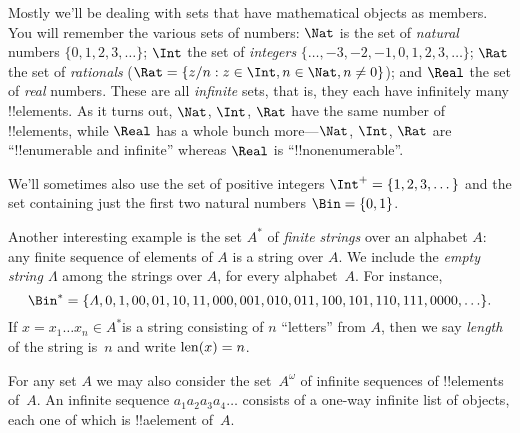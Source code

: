 \documentclass[../../../include/open-logic-section]{subfiles}
\begin{document}

\begin{ex}
Mostly we'll be dealing with sets that have mathematical objects as
members. You will remember the various sets of numbers: $\Nat$
is the set of \emph{natural} numbers $\{0, 1, 2, 3, \dots\}$;
$\Int$ the set of \emph{integers} $\{\dots, -3, -2,
-1, 0, 1, 2, 3, \dots\}$; $\Rat$ the set of
\emph{rationals} ($\Rat = \Setabs{z/n}{z \in \Int, n \in \Nat, n \neq 0}$); and
$\Real$ the set of \emph{real} numbers. These are all \emph{infinite}
sets, that is, they each have infinitely many !!{element}s. As it turns
out, $\Nat$, $\Int$, $\Rat$ have the same number
of !!{element}s, while $\Real$ has a whole bunch more---$\Nat$,
$\Int$, $\Rat$ are ``!!{enumerable} and infinite'' whereas
$\Real$ is ``!!{nonenumerable}''.

We'll sometimes also use the set of positive integers $\Int^+ = \{1,
2, 3, \dots\}$ and the set containing just the first two natural
numbers $\Bin = \{0, 1\}$.
\end{ex}

\begin{ex}[Strings]
Another interesting example  is the set $A^{*}$ of
\emph{finite strings} over an alphabet $A$: any finite sequence of elements of
$A$ is a string over $A$. We include the \emph{empty string $\Lambda$}
among the strings over $A$, for every alphabet~$A$. For instance,
\[
\Bin^*
=\{\Lambda,0,1,00,01,10,11,000,001,010,011,100,101,110,111,0000,\ldots\}.
\]
If $x=x_{1}\ldots x_{n}\in A^{*}$is a string consisting of $n$
``letters'' from $A$, then we say \emph{length} of the string is~$n$
and write $\mathrm{len}(x)=n$.
\end{ex}

\begin{ex}
For any set $A$ we may also consider the set~$A^\omega$ of infinite
sequences of !!{element}s of~$A$. An infinite sequence
$a_1a_2a_3a_4\dots$ consists of a one-way infinite list of objects,
each one of which is !!a{element} of~$A$.
\end{ex}
\end{document}
